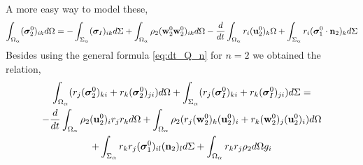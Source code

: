 A more easy way to model these,
\begin{multline}
    \int_{\Omega_\alpha} 
    (\bm{\sigma}_2^0)_{ik}
    d\Omega
    = 
    - \int_{\Sigma_\alpha} 
    (\bm{\sigma}_I)_{ik}
    d\Sigma
    +  \int_{\Omega_\alpha} \rho_2 
    (\textbf{w}_2^0\textbf{w}_2^0  )_{ik}
    d\Omega
    -\frac{d}{d t} \int_{\Omega_\alpha} r_i (\textbf{u}^0_2)_k \Omega
    +\int_{\Sigma_\alpha} 
     r_i (\bm{\sigma}_1^0 \cdot \textbf{n}_2)_{k}
    d\Sigma
\end{multline}
Besides using the general formula \ref{eq:dt_Q_n} for $n = 2$ we obtained the relation, 
\begin{multline}
    \int_{\Omega_\alpha} (r_{j}(\bm{\sigma}^0_2)_{ki}+r_{k}(\bm{\sigma}^0_2)_{ji})d\Omega
    +\int_{\Sigma_\alpha} (r_{j}(\bm{\sigma}^0_I)_{ki}+r_{k}(\bm{\sigma}_I^0)_{ji})d\Sigma
    = \\
    - \frac{d}{d t}\int_{\Omega_\alpha} \rho_2 (\textbf{u}_2^0)_i r_j r_k d\Omega
    + \int_{\Omega_\alpha} \rho_2 (r_{j} (\textbf{w}_2^0)_k (\textbf{u}^0_2)_i + r_k (\textbf{w}_2^0)_j (\textbf{u}^0_2)_i)d\Omega\\
    +\int_{\Sigma_\alpha}  r_{k}r_{j} (\bm{\sigma}_1^0)_{il} (\textbf{n}_2)_l d\Sigma
    + \int_{\Omega_\alpha} r_{k}r_{j}  \rho_2 d\Omega g_i
\end{multline}